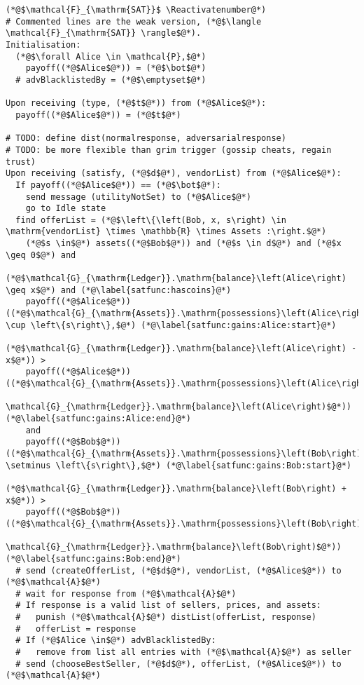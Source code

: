 \Suppressnumber
\begin{lstlisting}[label=satfunc, style=numbers]
(*@$\mathcal{F}_{\mathrm{SAT}}$ \Reactivatenumber@*)
# Commented lines are the weak version, (*@$\langle \mathcal{F}_{\mathrm{SAT}} \rangle$@*).
Initialisation:
  (*@$\forall Alice \in \mathcal{P},$@*)
    payoff((*@$Alice$@*)) = (*@$\bot$@*)
  # advBlacklistedBy = (*@$\emptyset$@*)

Upon receiving (type, (*@$t$@*)) from (*@$Alice$@*):
  payoff((*@$Alice$@*)) = (*@$t$@*)

# TODO: define dist(normalresponse, adversarialresponse)
# TODO: be more flexible than grim trigger (gossip cheats, regain trust)
Upon receiving (satisfy, (*@$d$@*), vendorList) from (*@$Alice$@*):
  If payoff((*@$Alice$@*)) == (*@$\bot$@*):
    send message (utilityNotSet) to (*@$Alice$@*)
    go to Idle state
  find offerList = (*@$\left\{\left(Bob, x, s\right) \in \mathrm{vendorList} \times \mathbb{R} \times Assets :\right.$@*)
    (*@$s \in$@*) assets((*@$Bob$@*)) and (*@$s \in d$@*) and (*@$x \geq 0$@*) and
    (*@$\mathcal{G}_{\mathrm{Ledger}}.\mathrm{balance}\left(Alice\right) \geq x$@*) and (*@\label{satfunc:hascoins}@*)
    payoff((*@$Alice$@*))((*@$\mathcal{G}_{\mathrm{Assets}}.\mathrm{possessions}\left(Alice\right) \cup \left\{s\right\},$@*) (*@\label{satfunc:gains:Alice:start}@*)
        (*@$\mathcal{G}_{\mathrm{Ledger}}.\mathrm{balance}\left(Alice\right) - x$@*)) >
    payoff((*@$Alice$@*))((*@$\mathcal{G}_{\mathrm{Assets}}.\mathrm{possessions}\left(Alice\right),
    \mathcal{G}_{\mathrm{Ledger}}.\mathrm{balance}\left(Alice\right)$@*)) (*@\label{satfunc:gains:Alice:end}@*)
    and
    payoff((*@$Bob$@*))((*@$\mathcal{G}_{\mathrm{Assets}}.\mathrm{possessions}\left(Bob\right) \setminus \left\{s\right\},$@*) (*@\label{satfunc:gains:Bob:start}@*)
        (*@$\mathcal{G}_{\mathrm{Ledger}}.\mathrm{balance}\left(Bob\right) + x$@*)) >
    payoff((*@$Bob$@*))((*@$\mathcal{G}_{\mathrm{Assets}}.\mathrm{possessions}\left(Bob\right),
    \mathcal{G}_{\mathrm{Ledger}}.\mathrm{balance}\left(Bob\right)$@*)) (*@\label{satfunc:gains:Bob:end}@*)
  # send (createOfferList, (*@$d$@*), vendorList, (*@$Alice$@*)) to (*@$\mathcal{A}$@*)
  # wait for response from (*@$\mathcal{A}$@*)
  # If response is a valid list of sellers, prices, and assets:
  #   punish (*@$\mathcal{A}$@*) distList(offerList, response)
  #   offerList = response
  # If (*@$Alice \in$@*) advBlacklistedBy:
  #   remove from list all entries with (*@$\mathcal{A}$@*) as seller
  # send (chooseBestSeller, (*@$d$@*), offerList, (*@$Alice$@*)) to (*@$\mathcal{A}$@*)

\end{lstlisting}
